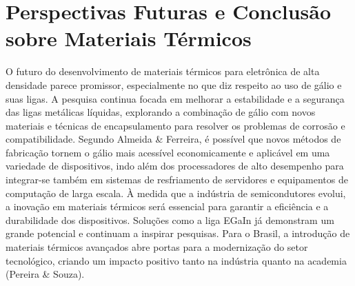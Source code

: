 \documentclass{article}
\begin{document}
\section{Perspectivas Futuras e Conclusão sobre Materiais Térmicos}
O futuro do desenvolvimento de materiais térmicos para eletrônica de alta densidade parece promissor, especialmente no que diz respeito ao uso de gálio e suas ligas. A pesquisa continua focada em melhorar a estabilidade e a segurança das ligas metálicas líquidas, explorando a combinação de gálio com novos materiais e técnicas de encapsulamento para resolver os problemas de corrosão e compatibilidade. Segundo Almeida \& Ferreira, é possível que novos métodos de fabricação tornem o gálio mais acessível economicamente e aplicável em uma variedade de dispositivos, indo além dos processadores de alto desempenho para integrar-se também em sistemas de resfriamento de servidores e equipamentos de computação de larga escala.
À medida que a indústria de semicondutores evolui, a inovação em materiais térmicos será essencial para garantir a eficiência e a durabilidade dos dispositivos. Soluções como a liga EGaIn já demonstram um grande potencial e continuam a inspirar pesquisas. Para o Brasil, a introdução de materiais térmicos avançados abre portas para a modernização do setor tecnológico, criando um impacto positivo tanto na indústria quanto na academia (Pereira \& Souza).
\newpage
\printbibliography
\end{document}

